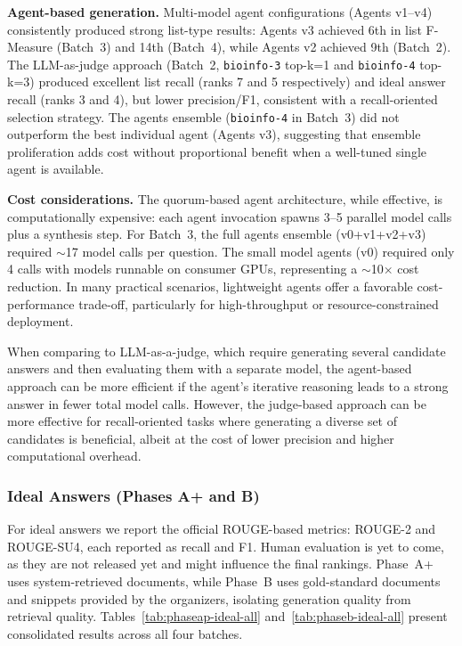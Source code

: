 \textbf{Agent-based generation.} Multi-model agent configurations (Agents v1--v4) consistently produced strong list-type results: Agents v3 achieved 6th in list F-Measure (Batch~3) and 14th (Batch~4), while Agents v2 achieved 9th (Batch~2). The LLM-as-judge approach (Batch~2, \texttt{bioinfo-3} top-k=1 and \texttt{bioinfo-4} top-k=3) produced excellent list recall (ranks 7 and 5 respectively) and ideal answer recall (ranks 3 and 4), but lower precision/F1, consistent with a recall-oriented selection strategy. The agents ensemble (\texttt{bioinfo-4} in Batch~3) did not outperform the best individual agent (Agents v3), suggesting that ensemble proliferation adds cost without proportional benefit when a well-tuned single agent is available.

\textbf{Cost considerations.} The quorum-based agent architecture, while effective, is computationally expensive: each agent invocation spawns 3--5 parallel model calls plus a synthesis step. For Batch~3, the full agents ensemble (v0+v1+v2+v3) required $\sim$17 model calls per question. The small model agents (v0) required only 4 calls with models runnable on consumer GPUs, representing a $\sim$10$\times$ cost reduction. In many practical scenarios, lightweight agents offer a favorable cost-performance trade-off, particularly for high-throughput or resource-constrained deployment.

When comparing to LLM-as-a-judge, which require generating several candidate answers and then evaluating them with a separate model, the agent-based approach can be more efficient if the agent's iterative reasoning leads to a strong answer in fewer total model calls. However, the judge-based approach can be more effective for recall-oriented tasks where generating a diverse set of candidates is beneficial, albeit at the cost of lower precision and higher computational overhead.

\subsubsection{Ideal Answers (Phases A+ and B)}
\label{sec:results-ideal}

For ideal answers we report the official ROUGE-based metrics: ROUGE-2 and ROUGE-SU4, each reported as recall and F1. Human evaluation is yet to come, as they are not released yet and might influence the final rankings. Phase~A+ uses system-retrieved documents, while Phase~B uses gold-standard documents and snippets provided by the organizers, isolating generation quality from retrieval quality. Tables~\ref{tab:phaseap-ideal-all} and~\ref{tab:phaseb-ideal-all} present consolidated results across all four batches.

